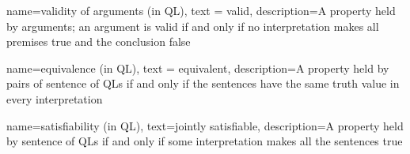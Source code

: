 {
  name=validity of arguments (in QL),
  text = valid,
description={A property held by arguments; an argument is valid if and only if no \gls{interpretation} makes all premises true and the conclusion false}
}

{
  name=equivalence (in QL),
  text = equivalent,
description={A property held by pairs of \glspl{sentence of QL} if and only if the sentences have the same truth value in every \gls{interpretation}}
}

{
  name=satisfiability (in QL),
  text=jointly satisfiable,
description={A property held by \glspl{sentence of QL} if and only if some \gls{interpretation} makes all the sentences true}
}

